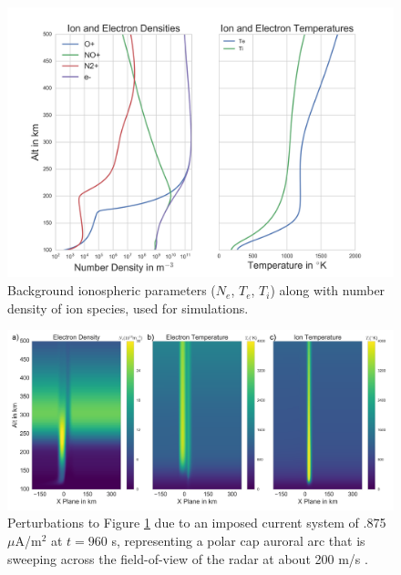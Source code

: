 \documentclass[draft,ras]{agutex}
\begin{document}
\begin{article}
\begin{figure}[!t]
\centering
\includegraphics[width=6in]{backgroundallparams}
\caption{Background ionospheric parameters ($N_e$, $T_e$, $T_i$) along with number density of ion species, used for simulations.}
\label{fig:plparamst0}
\end{figure}

\begin{figure}[!t]
\centering
\includegraphics[width=6in]{0960_15_int}
\caption{Perturbations to Figure \ref{fig:plparamst0} due to an imposed current system of .875 $\mu$A/m$^2$ at $t=960$ s, representing a polar cap auroral arc that is sweeping across the field-of-view of the radar at about 200 m/s \citep[c.f.][]{Perry:2015jf}.}
\label{fig:plparamst60}
\end{figure}


\end{article}
\end{document}
